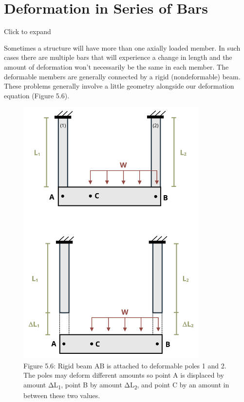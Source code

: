 \documentclass[
  letterpaper,
  DIV=11,
  numbers=noendperiod]{scrreprt}
\theoremstyle{definition}
\theoremstyle{remark}
\begin{document}
\section{Deformation in Series of Bars}\label{sec-5.4}

Click to expand

Sometimes a structure will have more than one axially loaded member. In
such cases there are multiple bars that will experience a change in
length and the amount of deformation won't necessarily be the same in
each member. The deformable members are generally connected by a rigid
(nondeformable) beam. These problems generally involve a little geometry
alongside our deformation equation (Figure 5.6).

\begin{figure}[H]

{\centering \includegraphics[width=3.75in,height=\textheight]{images/PNGs/Figure 5.7.png}

}

\caption{Figure 5.6: Rigid beam AB is attached to deformable poles 1 and
2. The poles may deform different amounts so point A is displaced by
amount ΔL\textsubscript{1}, point B by amount ΔL\textsubscript{2}, and
point C by an amount in between these two values.}

\end{figure}%
\end{document}
